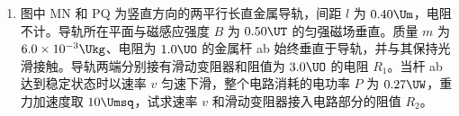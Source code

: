 \documentclass[\gkver]{gaokaozhenti}
\begin{document}
\begin{enumerate}
\begin{enumerate}
	在操作步骤②时还应注意和。

	\item
	将测量头的分划板中心刻线与某条亮纹中心对齐，将该亮纹定为第 1 条亮纹，此时手轮上的示数如图~\ref{2005天津22a} 所示。然后同方向转动测量头，使分划板中心刻线与第 6 条亮纹中心对齐，记下此时图~\ref{2005天津22b} 中手轮上的示数$\Umm$，求得相邻亮纹的间距 $\Delta x$ 为$\Umm$。

	{figs/22c.png}

	\item
	已知双缝间距 $d$ 为 $2.0\times10^{-4}\Um$，测得双缝到屏的距离 $l$ 为 $0.700\Um$，由计算式 $\lambda=$，求得所测红光波长为$\Unm$。
\end{enumerate}



\item
图中 MN 和 PQ 为竖直方向的两平行长直金属导轨，间距 $l$ 为 $0.40\Um$，电阻不计。导轨所在平面与磁感应强度 $B$ 为 $0.50\UT$ 的匀强磁场垂直。质量 $m$ 为 $6.0\times10^{-3}\Ukg$、电阻为 $1.0\UO$ 的金属杆 ab 始终垂直于导轨，并与其保持光滑接触。导轨两端分别接有滑动变阻器和阻值为 $3.0\UO$ 的电阻 $R_{1}$。当杆 ab 达到稳定状态时以速率 $v$ 匀速下滑，整个电路消耗的电功率 $P$ 为 $0.27\UW$，重力加速度取 $10\Umsq$，试求速率 $v$ 和滑动变阻器接入电路部分的阻值 $R_{2}$。



\end{enumerate}
\end{document}
